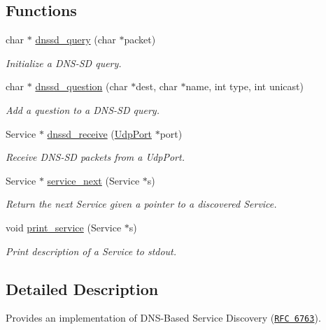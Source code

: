 \subsection*{Functions}
\begin{DoxyCompactItemize}
\item 
char $\ast$ \hyperlink{group__dnssd__client_ga8f7a5f9ac12499f257a2246565d08594}{dnssd\+\_\+query} (char $\ast$packet)
\begin{DoxyCompactList}\small\item\em Initialize a D\+N\+S-\/\+SD query. \end{DoxyCompactList}\item 
char $\ast$ \hyperlink{group__dnssd__client_ga5bd74cd3f020394cb9b4df715fc18872}{dnssd\+\_\+question} (char $\ast$dest, char $\ast$name, int type, int unicast)
\begin{DoxyCompactList}\small\item\em Add a question to a D\+N\+S-\/\+SD query. \end{DoxyCompactList}\item 
Service $\ast$ \hyperlink{group__dnssd__client_ga1c4f7e5942f7beaf7646dcbbfe687382}{dnssd\+\_\+receive} (\hyperlink{group__udp_ga0c4c532cfe05c936ac56874867ba49e4}{Udp\+Port} $\ast$port)
\begin{DoxyCompactList}\small\item\em Receive D\+N\+S-\/\+SD packets from a Udp\+Port. \end{DoxyCompactList}\item 
Service $\ast$ \hyperlink{group__dnssd__client_ga18c057a6f1be1a5916c765a4f344f1ea}{service\+\_\+next} (Service $\ast$s)
\begin{DoxyCompactList}\small\item\em Return the next Service given a pointer to a discovered Service. \end{DoxyCompactList}\item 
void \hyperlink{group__dnssd__client_gaa3bb0c6fef63b306e3c422be939adc48}{print\+\_\+service} (Service $\ast$s)
\begin{DoxyCompactList}\small\item\em Print description of a Service to stdout. \end{DoxyCompactList}\end{DoxyCompactItemize}


\subsection{Detailed Description}
Provides an implementation of D\+N\+S-\/\+Based Service Discovery (\href{https://tools.ietf.org/html/rfc6763}{\tt R\+FC 6763}). 

